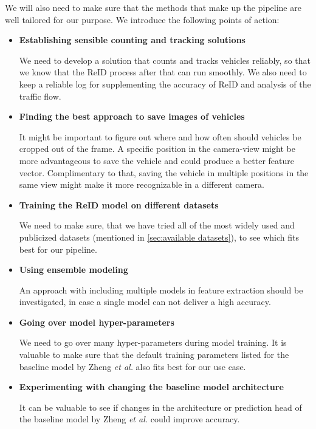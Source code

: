 \documentclass[conference]{IEEEtran} %
\begin{document}
		We will also need to make sure that the methods that make up the pipeline are well tailored for our purpose. We introduce the following points of action:
		\begin{itemize}
			\item \textbf{Establishing sensible counting and tracking solutions}

			We need to develop a solution that counts and tracks vehicles reliably, so that we know that the ReID process after that can run smoothly. We also need to keep a reliable log for supplementing the accuracy of ReID and analysis of the traffic flow.
			
			\item \textbf{Finding the best approach to save images of vehicles}

			It might be important to figure out where and how often should vehicles be cropped out of the frame. A specific position in the camera-view might be more advantageous to save the vehicle and could produce a better feature vector. Complimentary to that, saving the vehicle in multiple positions in the same view might make it more recognizable in a different camera.
			
			\item \textbf{Training the ReID model on different datasets}
			
			We need to make sure, that we have tried all of the most widely used and publicized datasets (mentioned in \ref{sec:available datasets}), to see which fits best for our pipeline.
			
			\item \textbf{Using ensemble modeling}

			An approach with including multiple models in feature extraction should be investigated, in case a single model can not deliver a high accuracy.
			
			\item \textbf{Going over model hyper-parameters}
			
			We need to go over many hyper-parameters during model training. It is valuable to make sure that the default training parameters listed for the baseline model by Zheng \textit{et al.} also fits best for our use case.
			
			\item \textbf{Experimenting with changing the baseline model architecture}

			It can be valuable to see if changes in the architecture or prediction head of the baseline model by Zheng \textit{et al.} could improve accuracy.
			
		\end{itemize}
	
\end{document}
